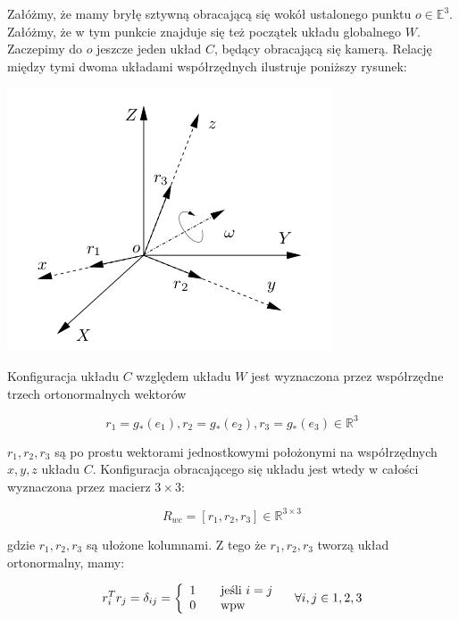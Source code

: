 \documentclass[a4paper,12pt]{article}
\newcommand{\E}{\mathbb{E}}
\newcommand{\RR}{\mathbb{R}^3}
\newcommand{\RRR}{\mathbb{R}^{3 \times 3}}
\begin{document}
Załóżmy, że mamy bryłę sztywną obracającą się wokół ustalonego punktu $o \in \E^3$. Załóżmy, że w tym punkcie znajduje się też początek układu globalnego $W$. Zaczepimy do $o$ jeszcze jeden układ $C$, będący obracającą się kamerą. Relację między tymi dwoma układami współrzędnych ilustruje poniższy rysunek:

\begin{center}
\includegraphics[scale=0.5]{img/rys1.png}
\end{center}

Konfiguracja układu $C$ względem układu $W$ jest wyznaczona przez współrzędne trzech ortonormalnych wektorów 

\begin{equation}
r_1=g_*(e_1), r_2=g_*(e_2), r_3=g_*(e_3) \in \RR
\end{equation}

$r_1,r_2,r_3$ są po prostu wektorami jednostkowymi położonymi na współrzędnych $x,y,z$ układu $C$. Konfiguracja obracającego się układu jest wtedy w całości wyznaczona przez macierz $3 \times 3$:

\begin{equation}
R_{wc} = [r_1,r_2,r_3] \in \RRR 
\end{equation}

\noindent gdzie $r_1,r_2,r_3$ są ułożone kolumnami. Z tego że $r_1,r_2,r_3$ tworzą układ ortonormalny, mamy:

\begin{equation}
r^T_ir_j = \delta_{ij} = \left\{
  \begin{array}{l l}
    1 & \quad \text{jeśli $i=j$}\\
    0 & \quad \text{wpw}\\
  \end{array} \right.
  \quad \forall i,j \in {1,2,3}
\end{equation}
\end{document}
